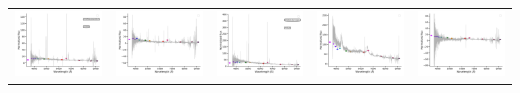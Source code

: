 \begin{center}
\begin{longtable}{l l l l l }
    \includegraphics[width=0.19\linewidth, clip]{Figs/Figs-lamost/spec-56983-EG233528N011847M01_sp05-120-STRIPE82-0164-033376.pdf} & \includegraphics[width=0.19\linewidth, clip]{Figs/Figs-lamost/spec-56983-EG233528N011847M01_sp08-192-STRIPE82-0164-020337.pdf} & \includegraphics[width=0.19\linewidth, clip]{Figs/Figs-lamost/spec-57043-EG030739N012421M01_sp02-020-STRIPE82-0067-036513.pdf} & \includegraphics[width=0.19\linewidth, clip]{Figs/Figs-lamost/spec-57043-EG030739N012421M01_sp04-155-STRIPE82-0068-063428.pdf} & \includegraphics[width=0.19\linewidth, clip]{Figs/Figs-lamost/spec-57043-EG030739N012421M01_sp05-021-STRIPE82-0068-006406.pdf} \\

\end{longtable}
\end{center}

